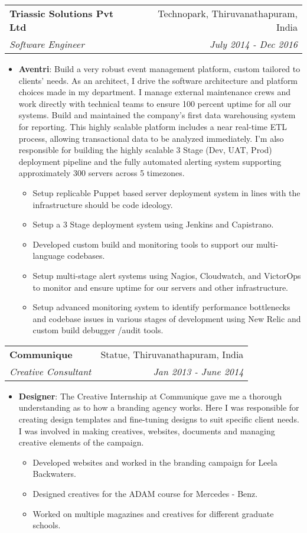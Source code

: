\documentclass[letterpaper,11pt]{article}
\makeatletter
\newcommand{\resumeItem}[2]{
  \item\small{
    \textbf{#1}{: #2 \vspace{-2pt}}
  }
}
\newcommand{\resumeSubheading}[4]{
  \vspace{-1pt}\item
    \begin{tabular*}{0.97\textwidth}[t]{l@{\extracolsep{\fill}}r}
      \textbf{#1} & #2 \\
      \textit{\small#3} & \textit{\small #4} \\
    \end{tabular*}\vspace{-5pt}
}
\newcommand{\resumeItemListStart}{\begin{itemize}}
\newcommand{\resumeItemListEnd}{\end{itemize}\vspace{-5pt}}
\makeatother
\begin{document}
    \resumeSubheading
      {Triassic Solutions Pvt Ltd}{Technopark, Thiruvanathapuram, India}
      {Software Engineer}{July 2014 - Dec 2016}
      \resumeItemListStart
        \resumeItem{Aventri}
          {Build a very robust event management platform, custom tailored to clients' needs. As an architect, I drive the software architecture and platform choices made in my department. I manage external maintenance crews and work directly with technical teams to ensure 100 percent uptime for all our systems.
          \newline
          Build and maintained the company's first data warehousing system for reporting. This highly scalable platform includes a near real-time ETL process, allowing transactional data to be analyzed immediately. I'm also responsible for building the highly scalable 3 Stage (Dev, UAT, Prod) deployment pipeline and the fully automated alerting system supporting approximately 300 servers across 5 timezones.}
          \begin{itemize}
              \item Setup replicable Puppet based server deployment system in lines with the infrastructure should be code ideology.
              \item Setup a 3 Stage deployment system using Jenkins and Capistrano.
              \item Developed custom build and monitoring tools to support our multi-language codebases.
              \item Setup multi-stage alert systems using Nagios, Cloudwatch, and VictorOps to monitor and ensure uptime for our servers and other infrastructure.
              \item Setup advanced monitoring system to identify performance bottlenecks and codebase issues in various stages of development using New Relic and custom build debugger /audit tools.
         \end{itemize}
      \resumeItemListEnd
      
      \resumeSubheading
      {Communique}{Statue, Thiruvanathapuram, India}
      {Creative Consultant}{Jan 2013 - June 2014}
      \resumeItemListStart
        \resumeItem{Designer}
          {The Creative Internship at Communique gave me a thorough understanding as to how a branding agency works. Here I was responsible for creating design templates and fine-tuning designs to suit specific client needs. I was involved in making creatives, websites, documents and managing creative elements of the campaign.}
          \begin{itemize}
              \item Developed websites and worked in the branding campaign for Leela Backwaters.
              \item Designed creatives for the ADAM course for Mercedes - Benz.
              \item Worked on multiple magazines and creatives for different graduate schools.
         \end{itemize}
      \resumeItemListEnd
\end{document}
